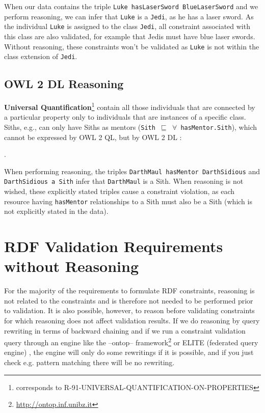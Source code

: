\documentclass{llncs}
\newcommand{\ms}[1]{\texttt{#1}}
\begin{document}
When our data contains the triple \ms{Luke hasLaserSword BlueLaserSword} and we perform reasoning, we can infer that \ms{Luke} is a \ms{Jedi}, as he has a laser sword.
As the individual \ms{Luke} is assigned to the class \ms{Jedi}, all constraint associated with this class are also validated, for example that Jedis must have blue laser swords.
Without reasoning, these constraints won't be validated as \ms{Luke} is not within the class extension of \ms{Jedi}.

\subsection{OWL 2 DL Reasoning}

\textbf{Universal Quantification}\footnote{corresponds to R-91-UNIVERSAL-QUANTIFICATION-ON-PROPERTIES}
contain all those individuals that are connected by a particular property only to individuals that are instances of a specific class.
Siths, e.g., can only have Siths as mentors (\ms{Sith $\sqsubseteq$ $\forall$ hasMentor.Sith}), 
which cannot be expressed by OWL 2 QL, but by OWL 2 DL \cite{owl2profiles2008}:

\begin{ex}
 .
\end{ex}

When performing reasoning, the triples \ms{DarthMaul hasMentor DarthSidious} and \ms{DarthSidious a Sith} infer that \ms{DarthMaul} is a Sith.
When reasoning is not wished, these explicitly stated triples cause a constraint violation, as each resource having \ms{hasMentor} relationships to a Sith must also be a Sith (which is not explicitly stated in the data).

\section{RDF Validation Requirements without Reasoning}
\label{RDF-Validation-Requirements-without-Reasoning}

For the majority of the requirements to formulate RDF constraints, reasoning is not related to the constraints and is therefore not needed to be performed prior to validation. 
It is also possible, however, to reason before validating constraints for which reasoning does not affect validation results.
If we do reasoning by query rewriting in terms of backward chaining and if we run a constraint validation query through an engine like the --ontop-- framework\footnote{\url{http://ontop.inf.unibz.it}} or ELITE (federated query engine) \cite{nolle2013elite}, the engine will only do some rewritings if it is possible, and if you just check e.g. pattern matching there will be no rewriting.
\end{document}
